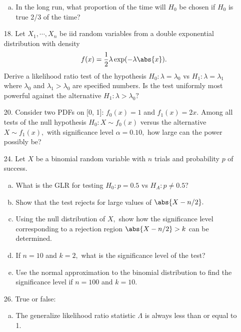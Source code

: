 \documentclass{article}
\begin{document}
\begin{itemize}
\begin{enumerate}[a.]
			\item In the long run, what proportion of the time will $H_0$ be chosen if $H_0$ is true 2/3 of the time?
				
		\end{enumerate}

	\item[18.] Let $X_1, \cdots, X_n$ be iid random variables from a double exponential distribution with density \[f(x)=\frac{1}{2}\lambda \exp(-\lambda\abs{x}).\] Derive a likelihood ratio test of the hypothesis $H_0:\lambda=\lambda_0$ vs $H_1:\lambda=\lambda_1$ where $\lambda_0$ and $\lambda_1>\lambda_0$ are specified numbers. Is the test uniformly most powerful against the alternative $H_1:\lambda>\lambda_0?$

	\item[20.] Consider two PDFs on [0, 1]: $f_0(x)=1$ and $f_1(x)=2x.$ Among all tests of the null hypothesis $H_0:X\sim f_0(x)$ versus the alternative $X\sim f_1(x),$ with significance level $\alpha=0.10,$ how large can the power possibly be?

	\item[24.] Let $X$ be a binomial random variable with $n$ trials and probability $p$ of success.
		\begin{enumerate}[a.]
			\item What is the GLR for testing $H_0:p=0.5$ vs $H_A:p\neq 0.5?$

			\item Show that the test rejects for large values of $\abs{X-n/2}.$

			\item Using the null distribution of $X,$ show how the significance level corresponding to a rejection region $\abs{X-n/2}>k$ can be determined.

			\item If $n=10$ and $k=2,$ what is the significance level of the test?

			\item Use the normal approximation to the binomial distribution to find the significance level if $n=100$ and $k=10.$
				
		\end{enumerate}

	\item[26.] True or false:
		\begin{enumerate}[a.]
			\item The generalize likelihood ratio statistic $\Lambda$ is always less than or equal to 1.


\end{enumerate}
\end{itemize}
\end{document}
